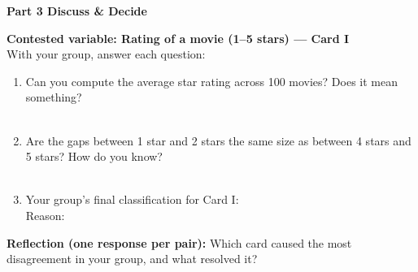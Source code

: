 \documentclass[10pt]{article}
\begin{document}
\vspace{0.16in}

{\large\bfseries\color{navy} Part 3 \quad Discuss \& Decide}

\vspace{0.1in}

\begin{tcolorbox}[colback=redbg, colframe=redacc, boxrule=0.8pt, arc=2mm,
    left=3mm, right=3mm, top=2mm, bottom=2mm]
\small\textbf{Contested variable: Rating of a movie (1--5 stars) --- Card I}\\[6pt]
With your group, answer each question:

\begin{enumerate}[leftmargin=1.5em, itemsep=6pt]
  \item Can you compute the average star rating across 100 movies? Does it mean something?\\[4pt]
        \writeline\\[1pt]\writeline

  \item Are the gaps between 1 star and 2 stars the same size as between 4 stars and 5 stars?
        How do you know?\\[4pt]
        \writeline\\[1pt]\writeline

  \item Your group's final classification for Card I: \blank{3.5cm}\\
        Reason: \writeline
\end{enumerate}
\end{tcolorbox}

\vspace{0.14in}

\begin{tcolorbox}[colback=goldbg, colframe=goldacc, boxrule=0.8pt, arc=2mm,
    left=3mm, right=3mm, top=2mm, bottom=2mm]
\small\textbf{Reflection \textnormal{\color{slate}(one response per pair):}}
\quad Which card caused the most disagreement in your group, and what resolved it?\\[6pt]
\writeline\\[1pt]\writeline
\end{tcolorbox}
\end{document}
